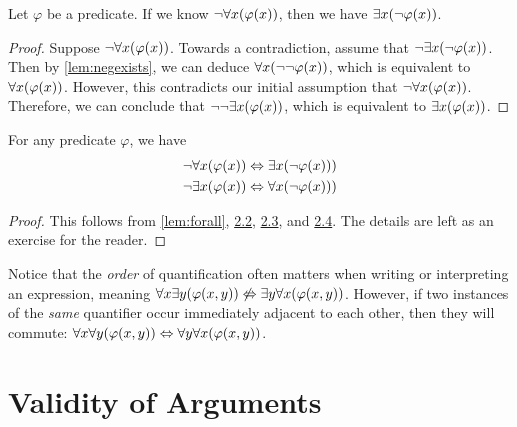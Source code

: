 \begin{lemma}\label{lem:negforall}
    Let \(\varphi\) be a predicate.
    If we know \(\neg \forall x \pn*{\varphi(x)}\), then we have \(\exists x \pn*{\neg \varphi(x)}\).
\end{lemma}
\begin{proof}
    Suppose \(\neg \forall x \pn*{\varphi(x)}\).
    Towards a contradiction, assume that \(\neg \exists x \pn*{\neg \varphi(x)}\).
    Then by \autoref{lem:negexists}, we can deduce \(\forall x \pn*{\neg \neg \varphi(x)}\),
    which is equivalent to \(\forall x \pn*{\varphi(x)}\).
    However, this contradicts our initial assumption that \(\neg \forall x \pn*{\varphi(x)}\). \contradiction\\
    Therefore, we can conclude that \(\neg \neg \exists x \pn*{\varphi(x)}\),
    which is equivalent to \(\exists x \pn*{\varphi(x)}\).
\end{proof}

\begin{theorem}
    For any predicate \(\varphi\), we have
    \begin{align*}
        \neg \forall x \pn*{\varphi(x)} &\iff \exists x \pn*{\neg \varphi(x))}\\
        \neg \exists x \pn*{\varphi(x)} &\iff \forall x \pn*{\neg \varphi(x))}\\
    \end{align*}
\end{theorem}
\begin{proof}
    This follows from \autoref{lem:forall}, \hyperref[lem:negexists]{2.2}, \hyperref[lem:exists]{2.3},
    and \hyperref[lem:negforall]{2.4}.
    The details are left as an exercise for the reader.
\end{proof}

\begin{remark}
    Notice that the \emph{order} of quantification often matters when writing or interpreting an expression,
    meaning \(\forall x \exists y \pn*{\varphi(x, y)} \not \iff \exists y \forall x \pn*{\varphi(x, y)}\).
    However, if two instances of the \emph{same} quantifier occur immediately adjacent to each other,
    then they will commute: \(\forall x \forall y \pn*{\varphi(x, y)} \iff \forall y \forall x \pn*{\varphi(x, y)}\).
\end{remark}

\section{Validity of Arguments}

